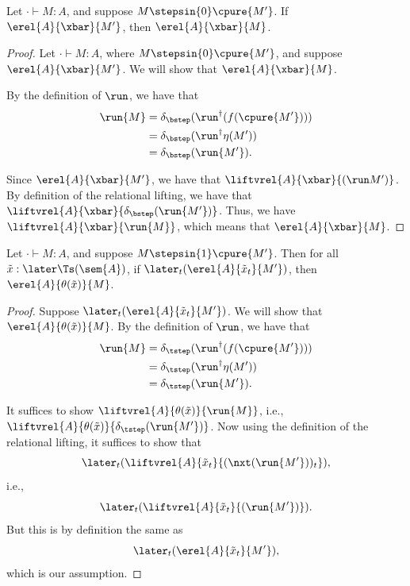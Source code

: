 \begin{lemma}\label{lem:anti-reduction}

  Let $\cdot \vdash M : A$, and suppose $M \stepsin{0} \cpure{M'}$. If
  $\erel{A}{\xbar}{M'}$, then $\erel{A}{\xbar}{M}$.

\end{lemma}
\begin{proof}
    Let $\cdot \vdash M : A$, where $M \stepsin{0} \cpure{M'}$, and suppose
    $\erel{A}{\xbar}{M'}$. We will show that $\erel{A}{\xbar}{M}$.


    By the definition of $\run$, we have that
    \begin{align*}
        \run{M} &= \delta_{\bstep} (\run^{\dag} {(f(\cpure{M'}))}) \\
                &= \delta_{\bstep} (\run^{\dag} {\eta(M')}) \\
                &= \delta_{\bstep} (\run{M'}).
    \end{align*}

    Since $\erel{A}{\xbar}{M'}$, we have that $\liftvrel{A}{\xbar}{(\run M')}$.
    By definition of the relational lifting, we have that
    $\liftvrel{A}{\xbar}{\delta_{\bstep}(\run{M'})}$. Thus, we have
    $\liftvrel{A}{\xbar}{\run{M}}$, which means that $\erel{A}{\xbar}{M}$.

\end{proof}

\begin{lemma}\label{lem:anti-reduction-true}
    Let $\cdot \vdash M : A$, and suppose $M \stepsin{1} \cpure{M'}$. Then for
    all $\tilde{x} : \later \Ts(\sem{A})$, if $\later_t
    (\erel{A}{\tilde{x}_t}{M'})$, then $\erel{A}{\theta(\tilde{x})}{M}$.
\end{lemma}
\begin{proof}
    Suppose $\later_t (\erel{A}{\tilde{x}_t}{M'})$. We will show that
    $\erel{A}{\theta(\tilde{x})}{M}$. By the definition of $\run$, we have that
    \begin{align*}
        \run{M} &= \delta_{\tstep} (\run^{\dag} {(f(\cpure{M'}))}) \\
                &= \delta_{\tstep} (\run^{\dag} {\eta(M')}) \\
                &= \delta_{\tstep} (\run{M'}).
    \end{align*}

    It suffices to show $\liftvrel{A}{\theta(\tilde{x})}{\run{M}}$,
    i.e., $\liftvrel{A}{\theta(\tilde{x})}{\delta_{\tstep}(\run{M'})}$.
    Now using the definition of the relational lifting, it suffices to show that
    \[ \later_t(\liftvrel{A}{\tilde{x}_t}{(\nxt (\run{M'}))_t}), \]
    i.e.,
    \[ \later_t(\liftvrel{A}{\tilde{x}_t}{(\run{M'})}). \]
    But this is by definition the same as
    \[ \later_t(\erel{A}{\tilde{x}_t}{M'}), \]
    which is our assumption.
\end{proof}


